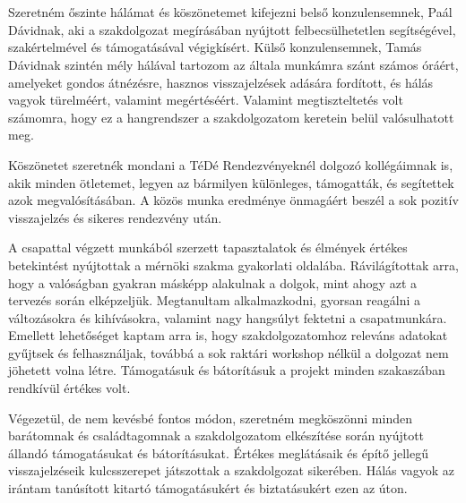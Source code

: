 \chapter*{\koszonetnyilvanitas}

Szeretném őszinte hálámat és köszönetemet kifejezni belső konzulensemnek, Paál Dávidnak, aki a szakdolgozat
megírásában nyújtott felbecsülhetetlen segítségével, szakértelmével és támogatásával végigkísért.
Külső konzulensemnek, Tamás Dávidnak szintén mély hálával tartozom az általa munkámra szánt számos óráért, 
amelyeket gondos átnézésre, hasznos visszajelzések adására fordított, és hálás vagyok türelméért, valamint megértéséért. Valamint
megtiszteltetés volt számomra, hogy ez a hangrendszer a szakdolgozatom keretein belül valósulhatott meg.

Köszönetet szeretnék mondani a TéDé Rendezvényeknél dolgozó kollégáimnak is, akik minden ötletemet, 
legyen az bármilyen különleges, támogatták, és segítettek azok megvalósításában. A közös munka eredménye önmagáért beszél
a sok pozitív visszajelzés és sikeres rendezvény után.

A csapattal végzett munkából szerzett tapasztalatok és élmények értékes betekintést nyújtottak a mérnöki 
szakma gyakorlati oldalába. Rávilágítottak arra, hogy a valóságban gyakran másképp alakulnak a dolgok, mint ahogy azt a tervezés során elképzeljük. 
Megtanultam alkalmazkodni, gyorsan reagálni a változásokra és kihívásokra, valamint nagy hangsúlyt fektetni a csapatmunkára. 
Emellett lehetőséget kaptam arra is, hogy szakdolgozatomhoz releváns adatokat gyűjtsek és felhasználjak, 
továbbá a sok raktári workshop nélkül a dolgozat nem jöhetett volna létre. 
Támogatásuk és bátorításuk a projekt minden szakaszában rendkívül értékes volt.

Végezetül, de nem kevésbé fontos módon, szeretném megköszönni minden barátomnak és 
családtagomnak a szakdolgozatom elkészítése során nyújtott állandó támogatásukat és bátorításukat. 
Értékes meglátásaik és építő jellegű visszajelzéseik kulcsszerepet játszottak a szakdolgozat sikerében. 
Hálás vagyok az irántam tanúsított kitartó támogatásukért és biztatásukért ezen az úton.